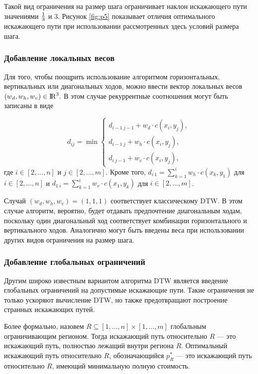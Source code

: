 \documentclass[a4paper, 14pt]{extarticle}
\numberwithin{figure}{subsection}
\numberwithin{equation}{subsection}
\begin{document}
Такой вид ограничения на размер шага ограничивает наклон искажающего пути значениями $1 \over 3$ и $3$. Рисунок \ref{fig:p5} показывает отличия оптимального искажающего пути при использовании рассмотренных здесь условий размера шага.

\subsubsection{Добавление локальных весов}

Для того, чтобы поощрить использование алгоритмом горизонтальных, вертикальных или диагональных ходов, можно ввести вектор локальных весов $(w_d,w_h,w_v) \in {\rm I\!R}^3.$ В этом случае рекуррентные соотношения могут быть записаны в виде

\begin{equation}
d_{ij} = \min
\begin{cases}
d_{i-1 \> j-1} + w_d \cdot c(x_i, y_j), \\
d_{i-1 \> j} + w_h \cdot c(x_i, y_j), \\
d_{i \> j-1} + w_v \cdot c(x_i, y_j),
\end{cases}
\end{equation}
где $i \in [2,\dots,n]$ и $j \in [2,\dots,m].$ Кроме того, $d_{i \> 1} = \sum_{k=1}^i w_h \cdot c(x_k, y_1)$ для $i \in [2,\dots,n]$ и $d_{1 \> i} = \sum_{k=1}^i w_v \cdot c(x_1, y_k)$ для $i \in [2,\dots,m]$.

Случай $(w_d,w_h,w_v) = (1,1,1)$ соответствует классическому DTW. В этом случае алгоритм, вероятно, будет отдавать предпочтение диагональным ходам, поскольку один диагональный ход соответствует комбинации горизонтального и вертикального ходов. Аналогично могут быть введены веса при использовании других видов ограничения на размер шага.

\subsubsection{Добавление глобальных ограничений}

Другим широко известным вариантом алгоритма DTW является введение глобальных ограничений на допустимые искажающие пути. Такие ограничения не только ускоряют вычисление DTW, но также предотвращают построение странных искажающих путей.

Более формально, назовем $R \subseteq [1,\dots,n] \times [1,\dots,m]$ глобальным ограничивающим регионом. Тогда искажающий путь относительно $R$ --- это искажающий путь, полностью лежащий внутри региона $R$. Оптимальный искажающий путь относительно $R$, обозначающийся $p_R^*$ --- это искажающий путь  относительно $R$, имеющий минимальную полную стоимость.
\end{document}
